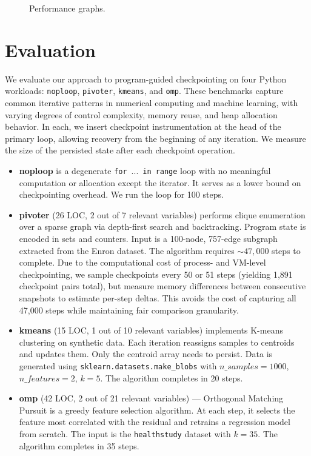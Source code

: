 \begin{figure*}[t]
    \centering
  \else
    
  \fi
  \caption{Performance graphs.}
\end{figure*}

\section{Evaluation}
\label{sec:evaluation}
We evaluate our approach to program-guided checkpointing on four Python workloads: \texttt{noploop}, \texttt{pivoter}, \texttt{kmeans}, and \texttt{omp}. These benchmarks capture common iterative patterns in numerical computing and machine learning, with varying degrees of control complexity, memory reuse, and heap allocation behavior. In each, we insert checkpoint instrumentation at the head of the primary loop, allowing recovery from the beginning of any iteration. We measure the size of the persisted state after each checkpoint operation.

\begin{itemize}[leftmargin=*]
    \item \textbf{noploop} is a degenerate  {\color{blue!50!black}
\texttt{for}~\textrm{...}~\texttt{in}~\texttt{range}} loop with no meaningful computation or allocation except the iterator. It serves as a lower bound on checkpointing overhead. We run the loop for 100 steps.

    \item \textbf{pivoter} (26 LOC, 2 out of 7 relevant variables) performs clique enumeration over a sparse graph via depth-first search and backtracking. Program state is encoded in sets and counters. Input is a 100-node, 757-edge subgraph extracted from the Enron dataset. The algorithm requires $\sim 47,000$ steps to complete. Due to the computational cost of process- and VM-level checkpointing, we sample checkpoints every 50 or 51 steps (yielding 1,891 checkpoint pairs total), but measure memory differences between consecutive snapshots to estimate per-step deltas. This avoids the cost of capturing all 47,000 steps while maintaining fair comparison granularity.

    \item \textbf{kmeans} (15 LOC, 1 out of 10 relevant variables) implements K-means clustering on synthetic data. Each iteration reassigns samples to centroids and updates them. Only the centroid array needs to persist. Data is generated using \texttt{sklearn.datasets.make\_blobs} with $n\_samples=1000$, $n\_features=2$, $k=5$. The algorithm completes in 20 steps.

    \item \textbf{omp} (42 LOC, 2 out of 21 relevant variables) --- Orthogonal Matching Pursuit is a greedy feature selection algorithm. At each step, it selects the feature most correlated with the residual and retrains a regression model from scratch. The input is the \texttt{healthstudy} dataset with $k = 35$. The algorithm completes in 35 steps.
\end{itemize}

